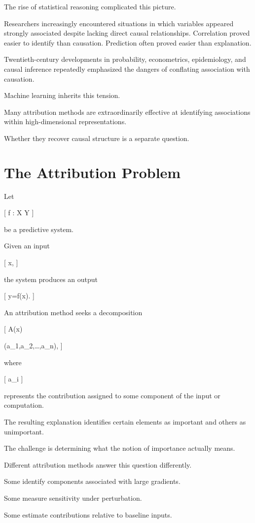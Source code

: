 \documentclass[11pt,oneside,openany]{book}
\begin{document}
The rise of statistical reasoning complicated this picture.

Researchers increasingly encountered situations in which variables appeared strongly associated despite lacking direct causal relationships. Correlation proved easier to identify than causation. Prediction often proved easier than explanation.

Twentieth-century developments in probability, econometrics, epidemiology, and causal inference repeatedly emphasized the dangers of conflating association with causation.

Machine learning inherits this tension.

Many attribution methods are extraordinarily effective at identifying associations within high-dimensional representations.

Whether they recover causal structure is a separate question.

\section{The Attribution Problem}

Let

[
f
:
\mathcal X
\rightarrow
\mathcal Y
]

be a predictive system.

Given an input

[
x,
]

the system produces an output

[
y=f(x).
]

An attribution method seeks a decomposition

[
A(x)

(a_1,a_2,\ldots,a_n),
]

where

[
a_i
]

represents the contribution assigned to some component of the input or computation.

The resulting explanation identifies certain elements as important and others as unimportant.

The challenge is determining what the notion of importance actually means.

Different attribution methods answer this question differently.

Some identify components associated with large gradients.

Some measure sensitivity under perturbation.

Some estimate contributions relative to baseline inputs.
\end{document}

